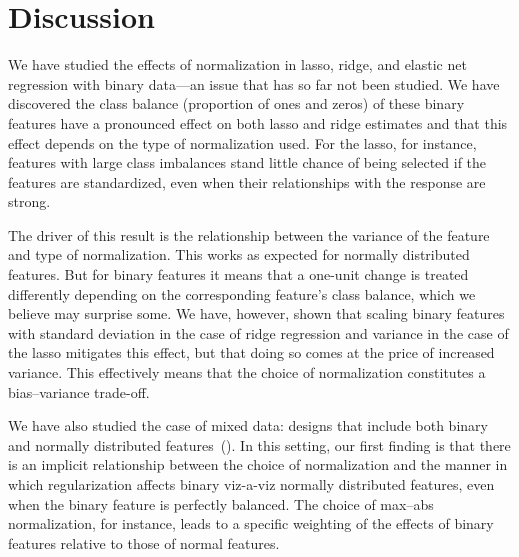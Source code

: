 \section{Discussion}%
\label{sec:discussion}

We have studied the effects of normalization in lasso, ridge, and elastic net regression
with binary data---an issue that has so far not been studied. We have discovered the class
balance (proportion of ones and zeros) of these binary features have a pronounced effect on
both lasso and ridge estimates and that this effect depends on the type of normalization
used. For the lasso, for instance, features with large class imbalances stand little chance
of being selected if the features are standardized, even when their relationships with the
response are strong.

The driver of this result is the relationship between the variance of the feature and type
of normalization. This works as expected for normally distributed features. But for binary
features it means that a one-unit change is treated differently depending on the
corresponding feature's class balance, which we believe may surprise some. We have,
however, shown that scaling binary features with standard deviation in the case of ridge
regression and variance in the case of the lasso mitigates this effect, but that doing so
comes at the price of increased variance. This effectively means that the choice of
normalization constitutes a bias--variance trade-off.


We have also studied the case of mixed data: designs that include both binary and normally
distributed features~(). In this setting, our first finding is that
there is an implicit relationship between the choice of normalization and the manner in
which regularization affects binary viz-a-viz normally distributed features, even when the
binary feature is perfectly balanced. The choice of max--abs normalization, for instance,
leads to a specific weighting of the effects of binary features relative to those of normal
features.

